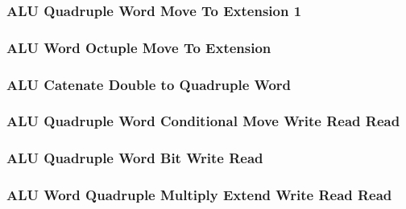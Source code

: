 

\subsubsection[{\small ALU Quadruple Word Move To Extension 1}]{ALU Quadruple Word Move To Extension 1} \label{sec:format-ALU-XMOVETQ1}



\subsubsection[{\small ALU Word Octuple Move To Extension}]{ALU Word Octuple Move To Extension} \label{sec:format-ALU-XMOVETO}



\subsubsection[{\small ALU Catenate Double to Quadruple Word}]{ALU Catenate Double to Quadruple Word} \label{sec:format-ALU-CATDQ}



\subsubsection[{\small ALU Quadruple Word Conditional Move Write Read Read}]{ALU Quadruple Word Conditional Move Write Read Read} \label{sec:format-ALU-QCMWRR}



\subsubsection[{\small ALU Quadruple Word Bit Write Read}]{ALU Quadruple Word Bit Write Read} \label{sec:format-ALU-QBWR}



\subsubsection[{\small ALU Word Quadruple Multiply Extend Write Read Read}]{ALU Word Quadruple Multiply Extend Write Read Read} \label{sec:format-ALU-QMEWRR}

